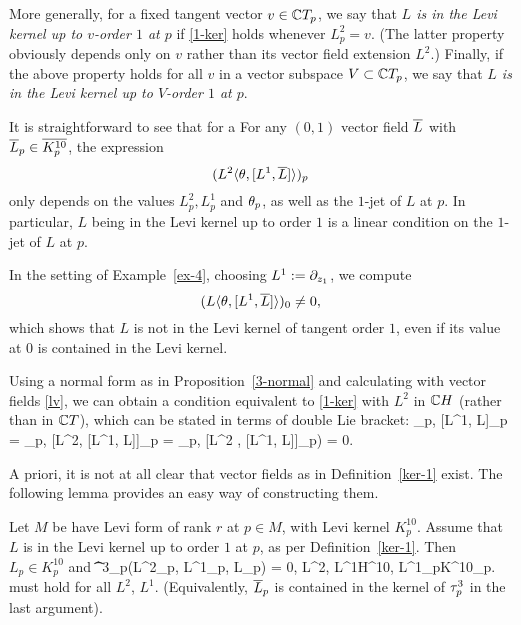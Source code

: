 \documentclass[12pt]{amsart}
\begin{document}
More generally, 
for a fixed tangent vector $v\in {\mathbb{C}} T_p$,
we say that
{\em $L$ is in the Levi kernel up to 
$v$-order $1$ at $p$} 
if \eqref{1-ker}
holds whenever $L^2_p=v$. 
(The latter property obviously depends only on $v$
rather than its vector field extension $L^2$.)
Finally, if the above property holds for all $v$
in a vector subspace $V\subset {\mathbb{C}} T_p$,
we say that
{\em $L$ is in the Levi kernel up to 
$V$-order $1$ at $p$}.
\ed



It is straightforward to see that for a
\bl{}
For any $(0,1)$ vector field $\overline{L}$
with $\overline{L}_p\in \overline{K^{10}_p}$, 
the expression
$$ 
	(L^2 \langle \theta, [L^1, \overline{L}] \rangle)_p 
$$
only depends on the values $L^2_p, L^1_p$ and $\theta_p$,
as well as the $1$-jet of $L$ at $p$.
In particular,  $L$ being in the Levi kernel up to order $1$
is a linear condition on the $1$-jet of $L$ at $p$.
\el

\be
In the setting of Example~\ref{ex-4},
choosing $L^1:= \partial_{z_1}$, we compute
$$
	(L \langle \theta, [L^1, \overline{L}] \rangle )_0 \ne 0,
$$
which shows that $L$ is not in the Levi kernel of tangent order $1$,
even if its value at $0$ is contained in the Levi kernel.
\ee


\br{}
Using a normal form as in Proposition~\ref{3-normal} 
and calculating with vector fields \eqref{lv},
we can obtain a condition equivalent to
 \eqref{1-ker}
with $L^2$ in ${\mathbb{C}} H$ (rather than in ${\mathbb{C}} T$), which can be 
stated in terms of double Lie bracket:
\beq{}
	\la \th_p, [L^1, \1L]_p\ra
	= \la \th_p, [L^2, [L^1, \1L]]_p \ra 
	= \la \th_p, [\1L^2 , [L^1, \1L]]_p\ra)
	= 0.
\eeq
\er



A priori, it is not at all clear
that vector fields as in Definition~\ref{ker-1} exist.
The following lemma
provides an easy way of constructing them.


\bl{}
Let $M$ be have Levi form of rank $r$ at $p\in M$,
with Levi kernel $K^{10}_p$.
Assume that $L$ is in the Levi kernel
up to order $1$ at $p$,
as per Definition~\ref{ker-1}.
Then $L_p\in K^{10}_p$ and
\beq{}
	\t^3_p(L^2_p, L^1_p, \1L_p) 
	= 0, 
	\quad L^2, L^1\in H^{10}, 
	\quad L^1_p\in K^{10}_p.
\eeq
must hold for all $L^2$, $L^1$.
(Equivalently, $\overline{L}_p$ is contained in the kernel of $\tau^3_p$ in the last argument).
\end{document}
